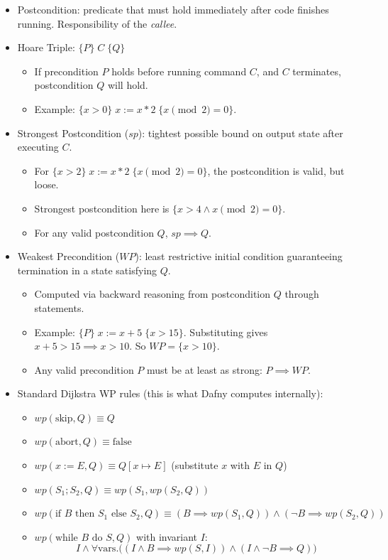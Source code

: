 \begin{itemize}
    \item Postcondition: predicate that must hold immediately after code finishes running. Responsibility of the \emph{callee}.
    
    \item Hoare Triple: $\{P\} \; C \; \{Q\}$
    \begin{itemize}
        \item If precondition $P$ holds before running command $C$, and $C$ terminates, postcondition $Q$ will hold.
        \item Example: $\{x > 0\} \; x := x * 2 \; \{x \pmod 2 = 0\}$.
    \end{itemize}

    \item Strongest Postcondition ($sp$): tightest possible bound on output state after executing $C$.
    \begin{itemize}
        \item For $\{x > 2\} \; x := x * 2 \; \{x \pmod 2 = 0\}$, the postcondition is valid, but loose.
        \item Strongest postcondition here is $\{x > 4 \land x \pmod 2 = 0\}$.
        \item For any valid postcondition $Q$, $sp \implies Q$.
    \end{itemize}

    \item Weakest Precondition ($WP$): least restrictive initial condition guaranteeing termination in a state satisfying $Q$.
    \begin{itemize}
        \item Computed via backward reasoning from postcondition $Q$ through statements.
        \item Example: $\{P\} \; x := x + 5 \; \{x > 15\}$. Substituting gives $x + 5 > 15 \implies x > 10$. So $WP = \{x > 10\}$.
        \item Any valid precondition $P$ must be at least as strong: $P \implies WP$.
    \end{itemize}

    \item Standard Dijkstra WP rules (this is what Dafny computes internally):
    \begin{itemize}
        \item $wp(\text{skip}, Q) \equiv Q$
        \item $wp(\text{abort}, Q) \equiv \text{false}$
        \item $wp(x := E, Q) \equiv Q[x \mapsto E]$ (substitute $x$ with $E$ in $Q$)
        \item $wp(S_1; S_2, Q) \equiv wp(S_1, wp(S_2, Q))$
        \item $wp(\text{if } B \text{ then } S_1 \text{ else } S_2, Q) \equiv (B \implies wp(S_1, Q)) \land (\neg B \implies wp(S_2, Q))$
        \item $wp(\text{while } B \text{ do } S, Q)$ with invariant $I$:
        \[
        I \land \forall \text{vars}. \big((I \land B \implies wp(S, I)) \land (I \land \neg B \implies Q)\big)
        \]
    \end{itemize}


\end{itemize}
